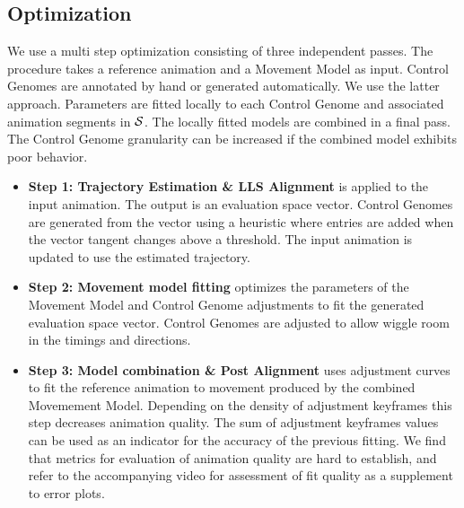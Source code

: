 \subsection{Optimization}
We use a multi step optimization consisting of three independent passes. The procedure takes a reference animation and a Movement Model as input. Control Genomes are annotated by hand or generated automatically. We use the latter approach. Parameters are fitted locally to each Control Genome and associated animation segments in $\mathcal{S}$. The locally fitted models are combined in a final pass. The Control Genome granularity can be increased if the combined model exhibits poor behavior.
\begin{itemize}
    \item {\bf{Step 1: Trajectory Estimation \& LLS Alignment}} is applied to the input animation. The output is an evaluation space vector. Control Genomes are generated from the vector using a heuristic where entries are added when the vector tangent changes above a threshold. The input animation is updated to use the estimated trajectory.
    \item {\bf{Step 2: Movement model fitting}} optimizes the parameters of the Movement Model and Control Genome adjustments to fit the generated evaluation space vector. Control Genomes are adjusted to allow wiggle room in the timings and directions.
    \item {\bf{Step 3: Model combination \& Post Alignment}} uses adjustment curves to fit the reference animation to movement produced by the combined Movemement Model. Depending on the density of adjustment keyframes this step decreases animation quality. The sum of adjustment keyframes values can be used as an indicator for the accuracy of the previous fitting. We find that metrics for evaluation of animation quality are hard to establish, and refer to the accompanying video for assessment of fit quality as a supplement to error plots.
\end{itemize}



